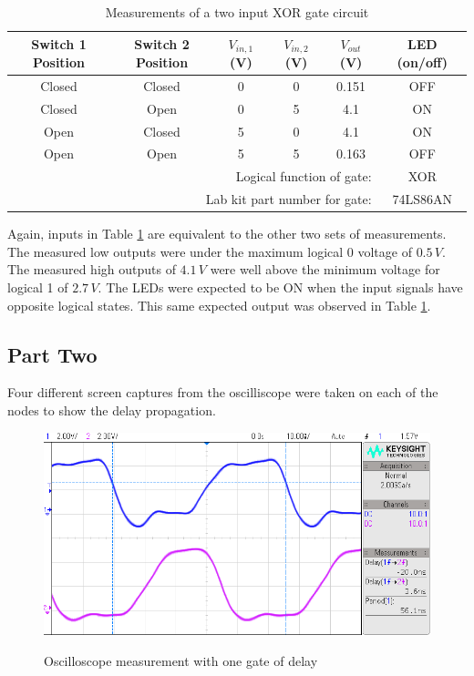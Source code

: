\documentclass[CMPE]{KGCOEReport}
\begin{document}
\begin{table}[h]
\renewcommand{\arraystretch}{1.2}
\caption{Measurements of a two input XOR gate circuit}
\begin{center}
\begin{tabular}{|c|c|c|c|c|c|}
\hline
Switch 1 Position & Switch 2 Position & $V_{in,1}$ (V) & $V_{in,2}$ (V) & $V_{out}$ (V) & LED (on/off)\\\hline

Closed & Closed & 0 & 0 & 0.151 & OFF \\\hline
Closed & Open   & 0 & 5 & 4.1   & ON \\\hline
Open   & Closed & 5 & 0 & 4.1   & ON \\\hline
Open   & Open   & 5 & 5 & 0.163 & OFF \\\hline
\multicolumn{5}{|r|}{Logical function of gate: } & XOR  \\\hline
\multicolumn{5}{|r|}{Lab kit part number for gate: } & 74LS86AN  \\\hline

\end{tabular}
\end{center}
\label{tab:XOR}
\end{table}

Again, inputs in Table \ref{tab:XOR} are equivalent to the other two sets of measurements. The measured low outputs were under the maximum logical 0 voltage of $0.5\,V$. The measured high outputs of $4.1\,V$ were well above the minimum voltage for logical 1 of $2.7\,V$. The LEDs were expected to be ON when the input signals have opposite logical states. This same expected output was observed in Table \ref{tab:XOR}.


\pagebreak
\subsection*{Part Two}

Four different screen captures from the oscilliscope were taken on each of the nodes to show the delay propagation.


\begin{figure}[H]
\includegraphics[width=\textwidth]{fig1}
\label{fig:osc-1}
\caption{Oscilloscope measurement with one gate of delay} 
\end{figure}
\end{document}
